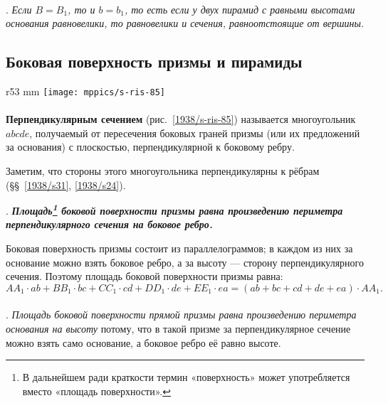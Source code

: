 \paragraph{}\label{1938/s77}
.
\emph{Если $B=B_1$, то и $b=b_1$, то есть если у двух пирамид с равными высотами основания равновелики, то равновелики и сечения, равноотстоящие от вершины.}


\subsection*{Боковая поверхность призмы и пирамиды}

\begin{wrapfigure}{r}{53 mm}
\vskip-0mm
\centering
\texttt{[image: mppics/s-ris-85]}
\caption{}\label{1938/s-ris-85}
\vskip-0mm
\end{wrapfigure}

\paragraph{}\label{1938/s78} \textbf{Перпендикулярным сечением} (рис.~\ref{1938/s-ris-85}) называется многоугольник $abcde$, получаемый от пересечения боковых граней призмы (или их предложений за основания) с плоскостью, перпендикулярной к боковому ребру.

Заметим, что стороны этого многоугольника перпендикулярны к рёбрам (§§~\ref{1938/s31}, \ref{1938/s24}).

\medskip

\mbox{.}
\textbf{\emph{Площадь\footnote{В дальнейшем ради краткости термин «поверхность» может употребляется вместо «площадь поверхности».} боковой поверхности призмы равна произведению периметра перпендикулярного сечения на боковое ребро.}}

{\sloppy

Боковая поверхность призмы состоит из параллелограммов;
в каждом из них за основание можно взять боковое ребро, а за высоту — сторону перпендикулярного сечения.
Поэтому площадь боковой поверхности призмы равна:
\[AA_1\cdot ab+ BB_1\cdot bc+CC_1\cdot cd+DD_1\cdot de+EE_1\cdot ea
=
(ab+ bc+ cd+ de+ ea)\cdot AA_1.\]

}

\paragraph{}\label{1938/s79}
.
\emph{Площадь боковой поверхности прямой призмы равна произведению периметра основания на высоту} потому, что в такой призме за перпендикулярное сечение можно взять само основание, а боковое ребро её равно высоте.


